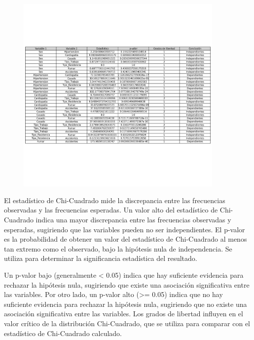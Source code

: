 \documentclass[a4paper, 12pt]{article}
\begin{document}
\begin{figure}[H]
    \centering
    \includegraphics[width=0.9\textwidth]{img/Tablas/test_chi_cuadrado.png}
\end{figure}
El estadístico de Chi-Cuadrado mide la discrepancia entre las frecuencias observadas y las frecuencias esperadas. Un valor alto del estadístico de Chi-Cuadrado indica una mayor discrepancia entre las frecuencias observadas y esperadas, sugiriendo que las variables pueden no ser independientes. El p-valor es la probabilidad de obtener un valor del estadístico de Chi-Cuadrado al menos tan extremo como el observado, bajo la hipótesis nula de independencia. Se utiliza para determinar la significancia estadística del resultado.

Un p-valor bajo (generalmente < 0.05) indica que hay suficiente evidencia para rechazar la hipótesis nula, sugiriendo que existe una asociación significativa entre las variables. Por otro lado, un p-valor alto (>= 0.05) indica que no hay suficiente evidencia para rechazar la hipótesis nula, sugiriendo que no existe una asociación significativa entre las variables. Los grados de libertad influyen en el valor crítico de la distribución Chi-Cuadrado, que se utiliza para comparar con el estadístico de Chi-Cuadrado calculado.

\end{document}
